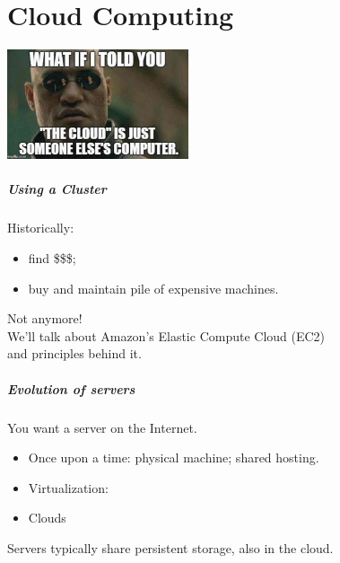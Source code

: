 \part{Cloud Computing}
\begin{frame}
\partpage
\begin{center}
	\includegraphics[width=0.4\textwidth]{images/thecloud.jpg}
\end{center}
\end{frame}

\begin{frame}
  \frametitle{Using a Cluster}

  
    Historically:
\begin{itemize}
  \item find \$\$\$;
  \item buy and maintain pile of expensive machines.
\end{itemize}

  Not anymore! \\[1em]

  We'll talk about Amazon's Elastic Compute Cloud (EC2)\\ and
  principles behind it.
  
\end{frame}

\begin{frame}
  \frametitle{Evolution of servers}

  

You want a server on the Internet.
\begin{itemize}
\item 
  Once upon a time: physical machine; shared hosting.
\item Virtualization:
\item Clouds
\end{itemize}

  Servers typically share persistent storage, also in
  the cloud. 

  
\end{frame}

